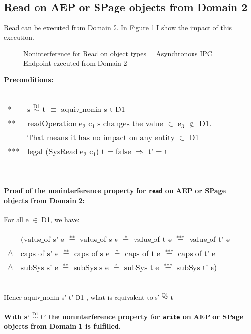 \subsection{Read on AEP or SPage objects from Domain 2}
Read can be executed from Domain 2. In Figure \ref{fig:ReadOut2} I show the impact of this execution. 
\begin{figure}[H]
\caption{Noninterference for Read on object types = Asynchronous IPC Endpoint executed from Domain 2}
\label{fig:ReadOut2}
\end{figure}
\textbf{Preconditions:} \\ \\
\begin{tabular}{ll}
* & s $\overset{\text{D1}}{\sim}$ t $\equiv$ aquiv$\_$nonin s t D1	\\ 
** & readOperation e$_2$ c$_1$ s changes the value $\in$ e$_3$ $\notin$ D1. \\
& That means it has no impact on any entity $\in$ D1 \\ 
*** & legal (SysRead e$_2$ c$_1$) t = false $\Rightarrow$ t' = t
\end{tabular} \\ \\ 
\textbf{Proof of the noninterference property for \texttt{read} on AEP or SPage objects from Domain 2:}\\ \\
For all e $\in$ D1, we have: \\ 
\begin{tabular}{ll}
& (value$\_$of s' e $\overset{\text{**}}{=}$ value$\_$of s e $\overset{\text{*}}{=}$ value$\_$of t e $\overset{\text{***}}{=}$ value$\_$of t' e \\
$\wedge$ & caps$\_$of s' e $\overset{\text{**}}{=}$ caps$\_$of s e $\overset{\text{*}}{=}$ caps$\_$of t e $\overset{\text{***}}{=}$ caps$\_$of t' e \\
$\wedge$ & subSys s' e $\overset{\text{**}}{=}$ subSys s e $\overset{\text{*}}{=}$ subSys t e $\overset{\text{***}}{=}$ subSys t' e)
\end{tabular} \\
Hence aquiv$\_$nonin s' t' D1 , what is equivalent to s' $\overset{\text{D1}}{\sim}$ t' \\ \\ 
\textbf{With s' $\overset{\text{D1}}{\sim}$ t' the noninterference property for \texttt{write} on AEP or SPage objects from Domain 1 is fulfilled.}  